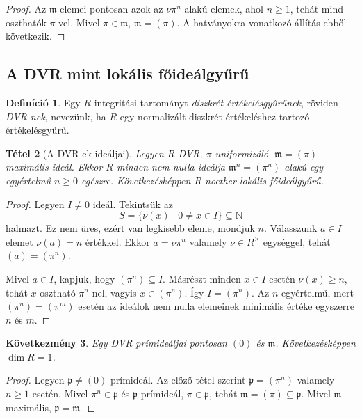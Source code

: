 \documentclass[11pt,a4paper]{article}
\newtheorem{tetel}{Tétel}[section]
\newtheorem{kovetkezmeny}[tetel]{Következmény}
\theoremstyle{definition}
\newtheorem{definicio}[tetel]{Definíció}
\newcommand{\mm}{\mathfrak m}
\newcommand{\pp}{\mathfrak p}
\newcommand{\NN}{\mathbb N}
\begin{document}
\begin{proof}
Az $\mm$ elemei pontosan azok az $\nu\pi^n$ alakú elemek, ahol
$n\geq 1$, tehát mind oszthatók $\pi$-vel. Mivel $\pi\in\mm$,
$\mm=(\pi)$. A hatványokra vonatkozó állítás ebből következik.
\end{proof}

\subsection{A DVR mint lokális főideálgyűrű}

\begin{definicio}
Egy $R$ integritási tartományt \emph{diszkrét értékelésgyűrűnek},
röviden \emph{DVR-nek}, nevezünk, ha $R$ egy normalizált diszkrét
értékeléshez tartozó értékelésgyűrű.
\end{definicio}

\begin{tetel}[A DVR-ek ideáljai]
Legyen $R$ DVR, $\pi$ uniformizáló, $\mm=(\pi)$ maximális ideál.
Ekkor $R$ minden nem nulla ideálja $\mm^n=(\pi^n)$ alakú egy
egyértelmű $n\geq 0$ egészre. Következésképpen $R$ noether lokális
főideálgyűrű.
\end{tetel}

\begin{proof}
Legyen $I\neq 0$ ideál. Tekintsük az
\[
  S=\{
\nu(x)\mid 0\neq x\in I\}\subseteq \NN
\]
halmazt. Ez nem üres, ezért van legkisebb eleme, mondjuk $n$. Válasszunk
$a\in I$ elemet $
\nu(a)=n$ értékkel. Ekkor $a=\nu\pi^n$ valamely
$\nu\in R^\times$ egységgel, tehát $(a)=(\pi^n)$.

Mivel $a\in I$, kapjuk, hogy $(\pi^n)\subseteq I$. Másrészt minden
$x\in I$ esetén $
\nu(x)\geq n$, tehát $x$ osztható $\pi^n$-nel, vagyis
$x\in(\pi^n)$. Így $I=(\pi^n)$. Az $n$ egyértelmű, mert
$(\pi^n)=(\pi^m)$ esetén az ideálok nem nulla elemeinek minimális
értéke egyszerre $n$ és $m$.
\end{proof}

\begin{kovetkezmeny}
Egy DVR prímideáljai pontosan $(0)$ és $\mm$. Következésképpen $\dim R=1$.
\end{kovetkezmeny}

\begin{proof}
Legyen $\pp\neq (0)$ prímideál. Az előző tétel szerint
$\pp=(\pi^n)$ valamely $n\geq 1$ esetén. Mivel $\pi^n\in\pp$ és
$\pp$ prímideál, $\pi\in\pp$, tehát $\mm=(\pi)\subseteq\pp$. Mivel
$\mm$ maximális, $\pp=\mm$.
\end{proof}
\end{document}

